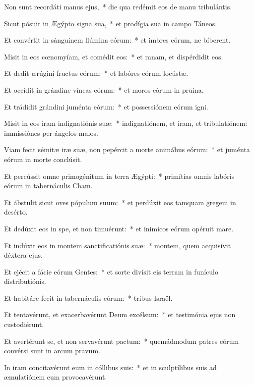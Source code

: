 
\item Non sunt recordáti manus ejus,~* die qua redémit eos de manu tribulántis.

\item Sicut pósuit in Ægýpto signa sua,~* et prodígia sua in campo Táneos.

\item Et convértit in sánguinem flúmina eórum:~* et imbres eórum, ne bíberent.

\item Misit in eos cœnomyíam, et comédit eos:~* et ranam, et dispérdidit eos.

\item Et dedit ærúgini fructus eórum:~* et labóres eórum locústæ.

\item Et occídit in grándine víneas eórum:~* et moros eórum in pruína.

\item Et trádidit grándini juménta eórum:~* et possessiónem eórum igni.

\item Misit in eos iram indignatiónis suæ:~* indignatiónem, et iram, et tribulatiónem: immissiónes per ángelos malos.

\item Viam fecit sémitæ iræ suæ, non pepércit a morte animábus eórum:~* et juménta eórum in morte conclúsit.

\item Et percússit omne primogénitum in terra Ægýpti:~* primítias omnis labóris eórum in tabernáculis Cham.

\item Et ábstulit sicut oves pópulum suum:~* et perdúxit eos tamquam gregem in desérto.

\item Et dedúxit eos in spe, et non timuérunt:~* et inimícos eórum opéruit mare.

\item Et indúxit eos in montem sanctificatiónis suæ:~* montem, quem acquisívit déxtera ejus.

\item Et ejécit a fácie eórum Gentes:~* et sorte divísit eis terram in funículo distributiónis.

\item Et habitáre fecit in tabernáculis eórum:~* tribus Israël.

\item Et tentavérunt, et exacerbavérunt Deum excélsum:~* et testimónia ejus non custodiérunt.

\item Et avertérunt se, et non servavérunt pactum:~* quemádmodum patres eórum convérsi sunt in arcum pravum.

\item In iram concitavérunt eum in cóllibus suis:~* et in sculptílibus suis ad æmulatiónem eum provocavérunt.
